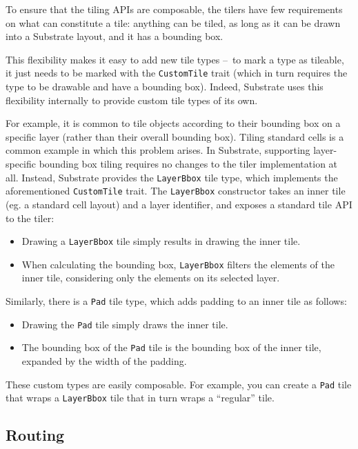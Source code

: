 To ensure that the tiling APIs are composable, the tilers have few requirements
on what can constitute a tile: anything can be tiled, as long as it can be drawn
into a Substrate layout, and it has a bounding box.

This flexibility makes it easy to add new tile types – to mark a type as tileable,
it just needs to be marked with the \verb|CustomTile| trait (which in turn requires
the type to be drawable and have a bounding box). Indeed, Substrate uses
this flexibility internally to provide custom tile types of its own.

For example, it is common to tile objects according to their bounding box
on a specific layer (rather than their overall bounding box).
Tiling standard cells is a common example in which this problem arises.
In Substrate, supporting layer-specific bounding box tiling requires no changes
to the tiler implementation at all.
Instead, Substrate provides the \verb|LayerBbox| tile type, which implements the
aforementioned \verb|CustomTile| trait. The \verb|LayerBbox| constructor takes an inner tile
(eg. a standard cell layout) and a layer identifier, and exposes a standard tile API to the tiler:
\begin{itemize}
\item Drawing a \verb|LayerBbox| tile simply results in drawing the inner tile.
\item When calculating the bounding box, \verb|LayerBbox| filters the elements of the inner tile, considering
  only the elements on its selected layer.
\end{itemize}

Similarly, there is a \verb|Pad| tile type, which adds padding to an inner tile as follows:
\begin{itemize}
\item Drawing the \verb|Pad| tile simply draws the inner tile.
\item The bounding box of the \verb|Pad| tile is the bounding box of the inner tile, expanded by the width of the padding.
\end{itemize}

These custom types are easily composable. For example, you can create a \verb|Pad| tile that wraps a \verb|LayerBbox| tile
that in turn wraps a ``regular'' tile.


\subsection{Routing} \label{sec:routing}

